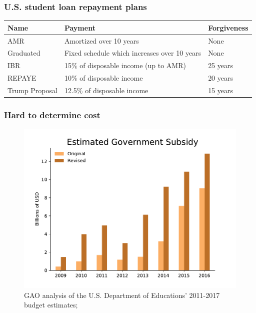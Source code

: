 \documentclass[10pt]{beamer}
\begin{document}
  \begin{frame} \frametitle{U.S. student loan repayment plans}

    \begin{table}
      {\small
      \hspace*{-0.5cm}\begin{tabular}{lll}
        \toprule
        \textbf{Name} & \textbf{Payment} & \textbf{Forgiveness} \\
        \midrule
        {\color{myred} AMR} & Amortized over 10 years & None \\
        {\color{myred} Graduated} & Fixed schedule which increases over 10 years & None \\
        {\color{mygreen} IBR} & 15\% of disposable income (up to AMR) & 25 years \\
        {\color{mygreen} REPAYE} & 10\% of disposable income & 20 years \\
        {\color{mygreen} Trump Proposal} & 12.5\% of disposable income & 15 years \\
        \bottomrule
      \end{tabular}
      }
    \end{table}

  \end{frame}

  \begin{frame} \frametitle{Hard to determine cost}

     \begin{figure}
       \includegraphics[width=\textwidth]{../ms/images/StudentLoans/GovSubsidy_Original_v_Revised.pdf}
       \caption*{\tiny{GAO analysis of the U.S. Department of Educations' 2011-2017 budget estimates; \cite{GAO-17-22}}}
     \end{figure}

  \end{frame}
\end{document}
